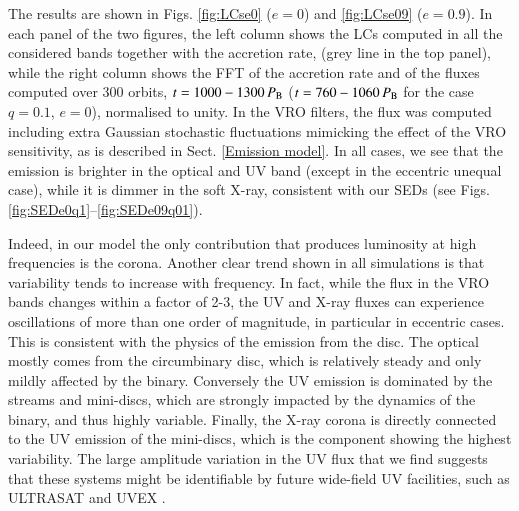 \documentclass{aa}
\begin{document}
The results are shown in Figs. \ref{fig:LCse0} ($e=0$) and \ref{fig:LCse09} ($e=0.9$). In each panel of the two figures, the left column shows the LCs computed in all the considered  bands together with the accretion rate, (grey line in the top panel), while the right column shows the FFT of the accretion rate and of the fluxes computed over 300 orbits, $t = 1000-1300 \, P_{\rm B }$ ($t = 760-1060\, P_{\rm B }$ for the case $q=0.1$, $e=0$), normalised to unity. In the VRO filters, the flux was computed including extra Gaussian stochastic fluctuations mimicking the effect of the VRO sensitivity, as is described in Sect. \ref{Emission model}. In all cases, we see that the emission is brighter in the optical and UV band (except in the eccentric unequal case), while it is dimmer in the soft X-ray, consistent with our SEDs (see Figs. \ref{fig:SEDe0q1}--\ref{fig:SEDe09q01}). 

Indeed, in our model the only contribution that produces luminosity at high frequencies is the corona. Another clear trend shown in all simulations is that variability tends to increase with frequency. In fact, while the flux in the VRO bands changes within a factor of 2-3, the UV and X-ray fluxes can experience oscillations of more than one order of magnitude, in particular in eccentric cases. This is consistent with the physics of the emission from the disc. The optical mostly comes from the circumbinary disc, which is relatively steady and only mildly affected by the binary. Conversely the UV emission is dominated by the streams and mini-discs, which are strongly impacted by the dynamics of the binary, and thus highly variable. Finally, the X-ray corona is directly connected to the UV emission of the mini-discs, which is the component showing the highest variability. The large amplitude variation in the UV flux that we find suggests that these systems might be identifiable by future wide-field UV facilities, such as ULTRASAT \citep[scheduled for launch in 2027,][]{ultrasat} and UVEX  \citep[scheduled for launch in 2030,][]{uvex}. 
\end{document}
